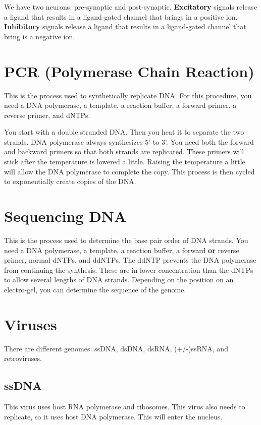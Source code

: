 \documentclass{article}
\begin{document}
We have two neurons: pre-synaptic and post-synaptic. \textbf{Excitatory} signals
release a ligand that results in a ligand-gated channel that brings in a
positive ion. \textbf{Inhibitory} signals release a ligand that results in a
ligand-gated channel that bring is a negative ion.

\section{PCR (Polymerase Chain Reaction)}

This is the process used to synthetically replicate DNA. For this procedure, you
need a DNA polymerase, a template, a reaction buffer, a forward primer, a
reverse primer, and dNTPs.

You start with a double stranded DNA. Then you heat it to separate the two
strands. DNA polymerase always synthesizes 5' to 3'. You need both the forward
and backward primers so that both strands are replicated. These primers will
stick after the temperature is lowered a little. Raising the temperature a
little will allow the DNA polymerase to complete the copy. This process is then
cycled to exponentially create copies of the DNA.

\section{Sequencing DNA}

This is the process used to determine the base pair order of DNA strands. You
need a DNA polymerase, a template, a reaction buffer, a forward \textbf{or}
reverse primer, normal dNTPs, and ddNTPs. The ddNTP prevents the DNA polymerase
from continuing the synthesis. These are in lower concentration than the dNTPs
to allow several lengths of DNA strands. Depending on the position on an
electro-gel, you can determine the sequence of the genome.

\section{Viruses}

There are different genomes: ssDNA, dsDNA, dsRNA, (+/-)ssRNA, and retroviruses.

\subsection{ssDNA}

This virus uses host RNA polymerase and ribosomes. This virus also needs to
replicate, so it uses host DNA polymerase. This will enter the nucleus.
\end{document}

